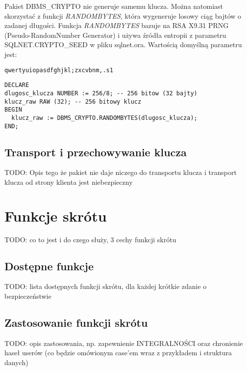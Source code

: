 \documentclass[12pt, a4paper]{article}
\begin{document}
Pakiet DBMS\_CRYPTO nie generuje samemu klucza. Można natomiast
skorzystać z funkcji \emph{RANDOMBYTES}, która wygeneruje losowy ciąg
bajtów o zadanej długości. Funkcja \emph{RANDOMBYTES} bazuje na RSA
X9.31 PRNG (Pseudo-RandomNumber Generator) i używa źródła entropii z
parametru SQLNET.CRYPTO\_SEED w pliku sqlnet.ora. Wartością domyślną
parametru jest:

\begin{lstlisting}
qwertyuiopasdfghjkl;zxcvbnm,.s1
\end{lstlisting}

\begin{lstlisting}
DECLARE
dlugosc_klucza NUMBER := 256/8; -- 256 bitow (32 bajty)
klucz_raw RAW (32); -- 256 bitowy klucz
BEGIN
  klucz_raw := DBMS_CRYPTO.RANDOMBYTES(dlugosc_klucza);
END;
\end{lstlisting}

\subsection{Transport i przechowywanie klucza}
TODO: Opis tego że pakiet nie daje niczego do transportu klucza i
transport
klucza od strony klienta jest niebezpieczny

\section{Funkcje skrótu}
TODO: co to jest i do czego służy, 3 cechy funkcji skrótu

\subsection{Dostępne funkcje}
TODO: lista dostępnych funkcji skrótu, dla każdej krótkie zdanie o
bezpieczeństwie

\subsection{Zastosowanie funkcji skrótu}
TODO: opis zastosowania, np. zapewnienie INTEGRALNOŚCI oraz chronienie
haseł
userów (co będzie omówionym case'em wraz z przykładem i struktura
danych)
\end{document}
